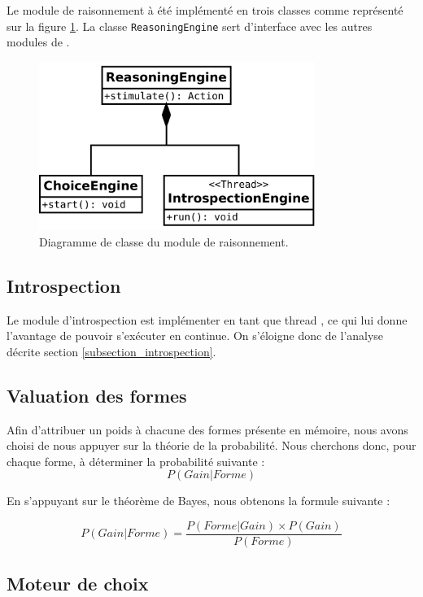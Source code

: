 
Le module de raisonnement à été implémenté en trois classes comme représenté sur la figure \ref{class_diag_reasoning_engine}. La classe \texttt{ReasoningEngine} sert d'interface avec les autres modules de \cogito{}. 

\begin{figure}[H] 
\center
\includegraphics[width=0.8\textwidth]{files/class_diagram/reasoningEngine} 
\caption{Diagramme de classe du module de raisonnement.}
\label{class_diag_reasoning_engine}
\end{figure}

\subsection{Introspection}


Le module d'introspection est implémenter en tant que \og thread \fg{}, ce qui lui donne l'avantage de pouvoir s'exécuter en continue. On s'éloigne donc de l'analyse décrite section \vref{subsection_introspection}.


\subsection{Valuation des formes}
  

Afin d'attribuer un poids à chacune des formes présente en mémoire, nous avons choisi de nous appuyer sur la théorie de la probabilité. Nous cherchons donc, pour chaque forme, à déterminer la probabilité suivante : \[ P(Gain|Forme) \]

En s'appuyant sur le théorème de Bayes, nous obtenons la formule suivante :

\[ P(Gain|Forme) = \frac{P(Forme|Gain) \times P(Gain)}{P(Forme)} \]

\subsection{Moteur de choix}


